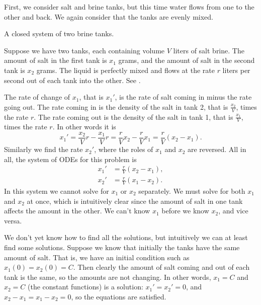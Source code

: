 \begin{example} \label{sintro:closedbrine-example}
First, we consider salt and brine tanks, but this time water flows
from one to the other and back.  We again consider that the tanks are
evenly mixed.

\begin{myfig}
\capstart
{}
\caption{A closed system of two brine tanks.\label{sintro:closedbrine}}
\end{myfig}

Suppose we have two tanks, each containing volume $V$ liters of salt brine.
The amount of salt in the first tank is $x_1$ grams, and the amount of salt
in the second tank is $x_2$ grams.  The liquid is perfectly mixed and
flows at the rate $r$ liters per second out of each tank into the other.
See .

The rate of change of $x_1$,
that is $x_1'$, is the
rate of salt coming in minus the rate going out.
The rate coming in is the
density of the salt in tank 2, that is $\frac{x_2}{V}$, times the rate $r$.
The rate coming out is the
density of the salt in tank 1, that is $\frac{x_1}{V}$, times the rate $r$.
In other words it is
\begin{equation*}
x_1' = \frac{x_2}{V} r - \frac{x_1}{V} r =
\frac{r}{V} x_2 - \frac{r}{V} x_1  = \frac{r}{V} (x_2-x_1).
\end{equation*}
Similarly we find the rate $x_2'$, where the roles of $x_1$ and $x_2$
are reversed.  All in all, the system of ODEs for this problem is
\begin{equation*}
\begin{aligned}
x_1' & = \frac{r}{V} (x_2-x_1), \\
x_2' & = \frac{r}{V} (x_1-x_2).
\end{aligned}
\end{equation*}
In this system we cannot solve for $x_1$ or $x_2$ separately.  We must
solve for both $x_1$ and $x_2$ at once, which is intuitively clear since
the amount of salt in one tank affects the amount in the other.
We can't know $x_1$ before we know $x_2$, and vice versa.

We don't yet know how to find all the solutions, but
intuitively we can at least find some solutions.  Suppose we
know that initially the tanks have the same amount of salt.  That is,
we have an initial condition such as $x_1(0)=x_2(0) = C$.  Then clearly the
amount of salt coming and out of each tank is the same, so the amounts are
not changing.  In other words, $x_1 = C$ and $x_2 = C$ (the constant
functions) is a solution:  $x_1' = x_2' = 0$, and
$x_2-x_1 = x_1-x_2 = 0$, so the equations are satisfied.


\end{example}
